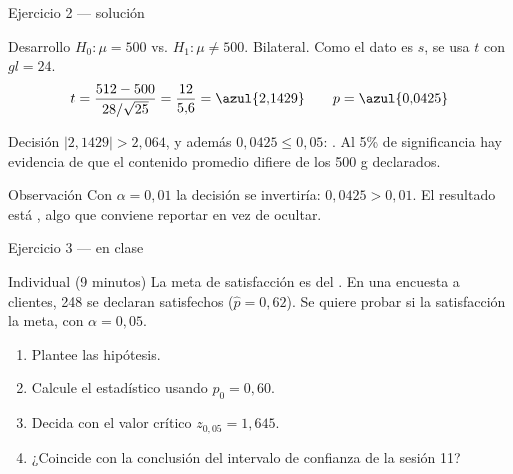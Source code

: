 \documentclass[aspectratio=169,10pt]{beamer}
\begin{document}
\begin{frame}{Ejercicio 2 — solución}
  \small
  \begin{block}{Desarrollo}
    \footnotesize
    $H_0:\mu=500$ \; vs. \; $H_1:\mu\neq 500$. Bilateral. Como el dato es $s$,
    se usa $t$ con $gl=24$.
    \[ t=\frac{512-500}{28/\sqrt{25}}=\frac{12}{5{,}6}=\azul{2{,}1429}
       \qquad p=\azul{0{,}0425} \]
  \end{block}

  \vspace{0.1cm}
  \begin{exampleblock}{Decisión}
    \footnotesize
    $|2{,}1429|>2{,}064$, y además $0{,}0425\le 0{,}05$: . Al 5\% de significancia hay evidencia de que el contenido
    promedio difiere de los 500 g declarados.
  \end{exampleblock}

  \vspace{0.1cm}
  \begin{alertblock}{Observación}
    \footnotesize
    Con $\alpha=0{,}01$ la decisión se invertiría: $0{,}0425>0{,}01$. El
    resultado está , algo que conviene reportar en vez de
    ocultar.
  \end{alertblock}
\end{frame}

\begin{frame}{Ejercicio 3 — en clase}
  \begin{alertblock}{Individual (9 minutos)}
    La meta de satisfacción es del . En una encuesta a
     clientes, 248 se declaran satisfechos
    ($\hat{p}=0{,}62$). Se quiere probar si la satisfacción
     la meta, con $\alpha=0{,}05$.

    \vspace{0.25cm}
    \begin{enumerate}
      \item Plantee las hipótesis.
      \item Calcule el estadístico usando $p_0=0{,}60$.
      \item Decida con el valor crítico $z_{0{,}05}=1{,}645$.
      \item ¿Coincide con la conclusión del intervalo de confianza de la
            sesión 11?
    \end{enumerate}
  \end{alertblock}
\end{frame}
\end{document}
